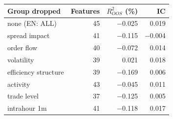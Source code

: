 \begin{tabular}{lrrr}
\toprule
Group dropped & Features & $R^2_{OOS}$ (\%) & IC\\
\midrule
none (EN: ALL) & 45 & \ensuremath{-}0.025 & 0.019\\
spread impact & 41 & \ensuremath{-}0.115 & \ensuremath{-}0.004\\
order flow & 40 & \ensuremath{-}0.072 & 0.014\\
volatility & 39 & 0.021 & 0.018\\
efficiency structure & 39 & \ensuremath{-}0.169 & 0.006\\
activity & 43 & \ensuremath{-}0.045 & 0.011\\
trade level & 37 & \ensuremath{-}0.125 & 0.005\\
intrahour 1m & 41 & \ensuremath{-}0.118 & 0.017\\
\bottomrule
\end{tabular}
